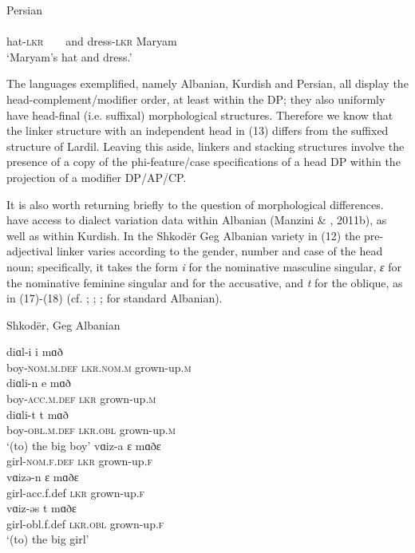 \documentclass[output=paper]{langsci/langscibook}
\begin{document}
\ea%
         Persian \citep[38]{Philip2012}\label{ex:manzini:16}\\
    \gll{} \\
          hat-\textsc{lkr}  ~ ~   and   dress-\textsc{lkr}   Maryam\\
    \glt  ‘Maryam’s hat and dress.’ 
\z
                    
The languages exemplified, namely Albanian, Kurdish and Persian, all display the head-complement/modifier order, at least within the DP; they also uniformly have head-final (i.e. suffixal) morphological structures. Therefore we know that the linker structure with an independent head in (13) differs from the suffixed structure of Lardil. Leaving this aside, linkers and stacking structures involve the presence of a copy of the phi-feature/case specifications of a head DP within the projection of a modifier DP/AP/CP.   

It is also worth returning briefly to the question of morphological differences. \citet{FrancoEtAl2015} have access to dialect variation data within Albanian (Manzini \& \citealt{Savoia2011a}, 2011b), as well as within Kurdish. In the Shkodër Geg Albanian variety in (12) the pre-adjectival linker varies according to the gender, number and case of the head noun; specifically, it takes the form \textit{i} for the nominative masculine singular, \textit{ɛ} for the nominative feminine singular and for the accusative, and \textit{t} for the oblique, as in (17)-(18) (cf. \citealt{Solano1972}; \citealt{Camaj1984}; \citealt{Turano2004}; \citealt{Campos2008} for standard Albanian).

\ea%
    Shkodër, Geg Albanian\label{ex:manzini:17}\\
    \begin{xlista}
    \ex
    \gll diɑl-i      i     mɑð           \\
         boy-\textsc{nom.m.def}   \textsc{lkr.nom.m}  grown-up.\textsc{m}\\
    \ex
    \gll diɑli-n     e     mɑð    \\
         boy-\textsc{acc.m.def     lkr}    grown-up.\textsc{m}\\
    \ex
    \gll diɑli-t              t     mɑð  \\
         boy-\textsc{obl.m.def}  \textsc{lkr.obl}  grown-up.\textsc{m}\\
    \glt ‘(to) the big boy’
    \gll vɑiz-a     ɛ     mɑðɛ    \\
         girl-\textsc{nom.f.def}   \textsc{lkr}    grown-up.\textsc{f} \\
    \gll vɑizə-n     ɛ     mɑðɛ    \\
         girl-acc.f.def    \textsc{lkr}    grown-up.\textsc{f}\\
    \gll vɑiz-əs    t     mɑðɛ \\
         girl-obl.f.def    \textsc{lkr.obl}  grown-up.\textsc{f}\\
    \glt ‘(to) the big girl’
    \end{xlista}
\z
\end{document}
